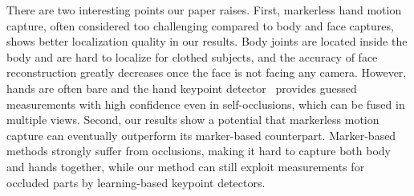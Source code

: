 There are two interesting points our paper raises. First, markerless hand motion capture, often considered too challenging compared to body and face captures, shows better localization quality in our results. Body joints are located inside the body and are hard to localize for clothed subjects, and the accuracy of face reconstruction greatly decreases once the face is not facing any camera. However, hands are often bare and the hand keypoint detector~\cite{simon2017hand} provides guessed measurements with high confidence even in self-occlusions, which can be fused in multiple views. Second, our results show a potential that markerless motion capture can eventually outperform its marker-based counterpart. Marker-based methods strongly suffer from occlusions, making it hard to capture both body and hands together, while our method can still exploit measurements for occluded parts by learning-based keypoint detectors.
